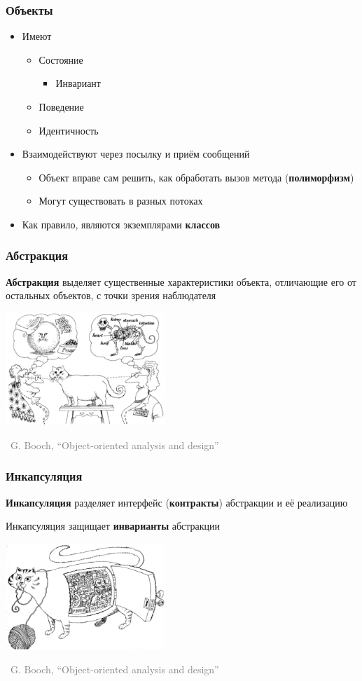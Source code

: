 \documentclass[xetex,mathserif,serif]{beamer}
\newcommand{\attribution}[1] {
	\begin{flushright}\begin{scriptsize}\textcolor{gray}{\textcopyright\, #1}\end{scriptsize}\end{flushright}
}
\begin{document}
	\begin{frame}
		\frametitle{Объекты}
		\begin{itemize}
			\item Имеют
			\begin{itemize}
				\item Состояние
				\begin{itemize}
					\item Инвариант
				\end{itemize}
				\item Поведение
				\item Идентичность
			\end{itemize}
			\item Взаимодействуют через посылку и приём сообщений
			\begin{itemize}
				\item Объект вправе сам решить, как обработать вызов метода (\textbf{полиморфизм})
				\item Могут существовать в разных потоках
			\end{itemize}
			\item Как правило, являются экземплярами \textbf{классов}
		\end{itemize}
	\end{frame}

	\begin{frame}
		\frametitle{Абстракция}
		\textbf{Абстракция} выделяет существенные характеристики объекта, отличающие его от остальных объектов, с точки зрения наблюдателя
		\vskip 1cm
		\begin{center}
			\includegraphics[width=0.45\textwidth]{abstraction.png}
		\end{center}
		\attribution{G. Booch, ``Object-oriented analysis and design''}
	\end{frame}

	\begin{frame}
		\frametitle{Инкапсуляция}
		\textbf{Инкапсуляция} разделяет интерфейс (\textbf{контракты}) абстракции и её реализацию

		Инкапсуляция защищает \textbf{инварианты} абстракции
		\vskip 1cm
		\begin{center}
			\includegraphics[width=0.45\textwidth]{incapsulation.png}
		\end{center}
		\attribution{G. Booch, ``Object-oriented analysis and design''}
	\end{frame}
\end{document}
